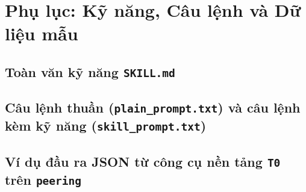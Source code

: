 \documentclass[12pt,a4paper]{report}
\begin{document}
\appendix
\chapter{Phụ lục: Kỹ năng, Câu lệnh và Dữ liệu mẫu}

\section{Toàn văn kỹ năng \texttt{SKILL.md}}


\section{Câu lệnh thuần (\texttt{plain\_prompt.txt}) và câu lệnh kèm kỹ năng (\texttt{skill\_prompt.txt})}



\section{Ví dụ đầu ra JSON từ công cụ nền tảng \texttt{T0} trên \texttt{peering}}

\end{document}
